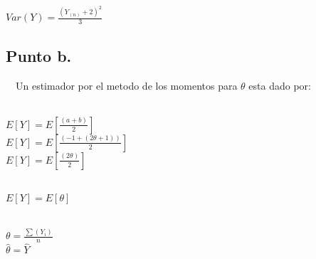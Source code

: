 \documentclass[letterpaper,12pt,onecolumn,titlepage]{article}
\begin{document}
~\\ $Var(Y) = \frac{(Y_{(n)}+2)^2}{3}$

\subsection{Punto b.}
~\ Un estimador por el metodo de los momentos para $\theta$ esta dado por:

~\\ $E[Y]= E[\frac{(a+b)}{2}]$
~\\ $E[Y]= E[\frac{(-1+(2\theta+1))}{2}]$
~\\ $E[Y]= E[\frac{(2\theta)}{2}]$

~\\ $E[Y]= E[\theta]$

~\\ $\theta = \frac{\sum(Y_{i})}{n}$ 
~\\ $\hat{\theta} = \hat{Y}$


\end{document}
